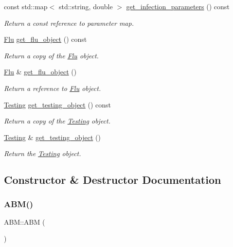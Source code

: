 \begin{DoxyCompactItemize}
const std\+::map$<$ std\+::string, double $>$ \hyperlink{classABM_a9d47abd943b465dfbcd0d5502cadc125}{get\+\_\+infection\+\_\+parameters} () const
\begin{DoxyCompactList}\small\item\em Return a const reference to parameter map. \end{DoxyCompactList}\item 
\hyperlink{classFlu}{Flu} \hyperlink{classABM_acb7023998f3b647d4dd8d095992d5dab}{get\+\_\+flu\+\_\+object} () const
\begin{DoxyCompactList}\small\item\em Return a copy of the \hyperlink{classFlu}{Flu} object. \end{DoxyCompactList}\item 
\hyperlink{classFlu}{Flu} \& \hyperlink{classABM_a66f5f10a0e0eb62e13226298ce518dd9}{get\+\_\+flu\+\_\+object} ()
\begin{DoxyCompactList}\small\item\em Return a reference to \hyperlink{classFlu}{Flu} object. \end{DoxyCompactList}\item 
\hyperlink{classTesting}{Testing} \hyperlink{classABM_adc6c1467a7b40acfa82e653874514190}{get\+\_\+testing\+\_\+object} () const
\begin{DoxyCompactList}\small\item\em Return a copy of the \hyperlink{classTesting}{Testing} object. \end{DoxyCompactList}\item 
\hyperlink{classTesting}{Testing} \& \hyperlink{classABM_a3e26915cf8a4cf763599d4a8ad352d5e}{get\+\_\+testing\+\_\+object} ()
\begin{DoxyCompactList}\small\item\em Return the \hyperlink{classTesting}{Testing} object. \end{DoxyCompactList}\end{DoxyCompactItemize}


\subsection{Constructor \& Destructor Documentation}
\mbox{\label{classABM_aaa90efc4e3d4c52fac43c09b9cf1dd5b}} 
\subsubsection{\texorpdfstring{A\+B\+M()}{ABM()}\hspace{0.1cm}{\footnotesize\ttfamily [1/2]}}
{\footnotesize\ttfamily A\+B\+M\+::\+A\+BM (\begin{DoxyParamCaption}{ }\end{DoxyParamCaption})\hspace{0.3cm}{\ttfamily [default]}}



